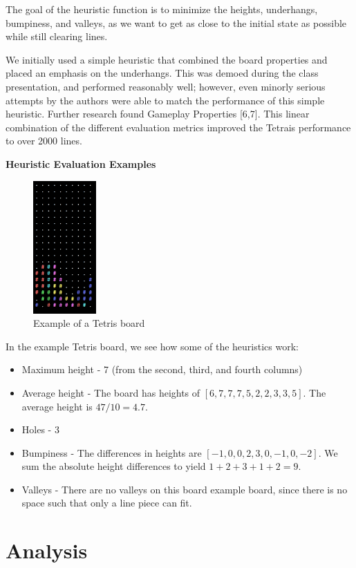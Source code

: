 \documentclass[11pt]{article}
\begin{document}
The goal of the heuristic function is to minimize the heights, underhangs, bumpiness, and valleys, as we want to get as close to the initial state as possible while still clearing lines.

We initially used a simple heuristic that combined the board properties and placed an emphasis on the underhangs. This was demoed during the class presentation, and performed reasonably well; however, even minorly serious attempts by the authors were able to match the performance of this simple heuristic. Further research found Gameplay Properties [6,7]. This linear combination of the different evaluation metrics improved the Tetrais performance to over 2000 lines.

\textbf{Heuristic Evaluation Examples}

\begin{figure}[h!]
    \centering
\includegraphics[height=2.0in]{bumpiness.png}
\caption{Example of a Tetris board}
\end{figure}

In the example Tetris board, we see how some of the heuristics work:
\begin{itemize}
    \item Maximum height - 7 (from the second, third, and fourth columns)
    \item Average height - The board has heights of $[6, 7, 7, 7, 5, 2, 2, 3, 3, 5]$. The average height is $47 / 10 = 4.7$. 
    \item Holes - 3
    \item Bumpiness -  The differences in heights are $[-1, 0, 0, 2, 3, 0, -1, 0, -2]$. We sum the absolute height differences to yield $1 + 2 + 3 + 1 + 2 = 9$.
    \item Valleys - There are no valleys on this board example board, since there is no space such that only a line piece can fit.
\end{itemize}

\section{Analysis}
\end{document}
